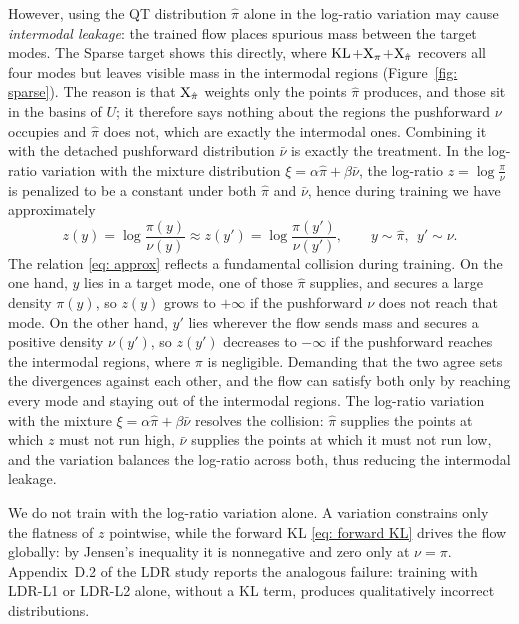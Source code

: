 \documentclass{article}
\begin{document}
However, using the QT distribution $\hat\pi$ alone in the log-ratio variation may cause \emph{intermodal leakage}: the trained flow places spurious mass between the target modes. The Sparse target shows this directly, where $\mathrm{KL}$+$\mathrm{X}_\pi$+$\mathrm{X}_{\hat\pi}$ recovers all four modes but leaves visible mass in the intermodal regions (Figure~\ref{fig: sparse}). The reason is that $\mathrm{X}_{\hat\pi}$ weights only the points $\hat\pi$ produces, and those sit in the basins of $U$; it therefore says nothing about the regions the pushforward $\nu$ occupies and $\hat\pi$ does not, which are exactly the intermodal ones. Combining it with the detached pushforward distribution $\bar\nu$ is exactly the treatment. In the log-ratio variation with the mixture distribution $\xi =\alpha\hat\pi+\beta\bar\nu$, the log-ratio $z=\log\frac{\pi}{\nu}$ is penalized to be a constant under both $\hat\pi$ and $\bar\nu$, hence during training we have approximately
\begin{equation}
	z(y) = \log\frac{\pi(y)}{\nu(y)} \approx z(y') = \log\frac{\pi(y')}{\nu(y')}, \qquad
	y\sim \hat\pi,~~y'\sim\nu.
	\label{eq: approx} 
\end{equation}
The relation \eqref{eq: approx} reflects a fundamental collision during training. On the one hand, $y$ lies in a target mode, one of those $\hat\pi$ supplies, and secures a large density $\pi(y)$, so $z(y)$ grows to $+\infty$ if the pushforward $\nu$ does not reach that mode. On the other hand, $y'$ lies wherever the flow sends mass and secures a positive density $\nu(y')$, so $z(y')$ decreases to $-\infty$ if the pushforward reaches the intermodal regions, where $\pi$ is negligible. Demanding that the two agree sets the divergences against each other, and the flow can satisfy both only by reaching every mode and staying out of the intermodal regions. The log-ratio variation with the mixture $\xi = \alpha\hat\pi+\beta\bar\nu$ resolves the collision: $\hat\pi$ supplies the points at which $z$ must not run high, $\bar\nu$ supplies the points at which it must not run low, and the variation balances the log-ratio across both, thus reducing the intermodal leakage.


\begin{remark}
	We do not train with the log-ratio variation alone. A variation constrains only the flatness of $z$ pointwise, while the forward KL \eqref{eq: forward KL} drives the flow globally: by Jensen's inequality it is nonnegative and zero only at $\nu=\pi$. Appendix~D.2 of the LDR study \citep{schopmans2026ldr} reports the analogous failure: training with LDR-L1 or LDR-L2 alone, without a KL term, produces qualitatively incorrect distributions.
\end{remark}
\end{document}
